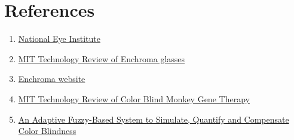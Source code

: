 \documentclass[12pt]{article}
\begin{document}
\section{References}
\singlespacing
\begin{enumerate}
	\item 
		\href{https://nei.nih.gov/health/color_blindness/facts_about}{National Eye Institute}

	\item
		\href{https://www.technologyreview.com/s/601782/how-enchromas-glasses-correct-color-blindness/}{MIT Technology Review of Enchroma glasses}
	
	\item
		\href{http://enchroma.com/contact-us/}{Enchroma website}
		
	\item
		\href{https://www.technologyreview.com/s/415339/color-blind-monkeys-get-full-color-vision/}{MIT Technology Review of Color Blind Monkey Gene Therapy}
		
	\item
		\href{https://arxiv.org/abs/1711.10662}{An Adaptive Fuzzy-Based System to Simulate, Quantify and Compensate Color Blindness}

\end{enumerate}
\end{document}
